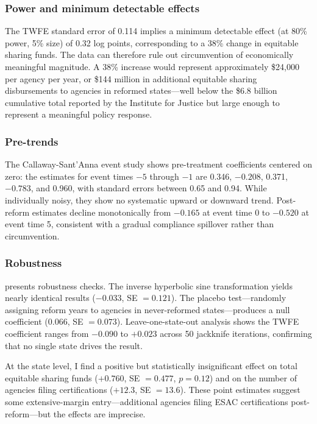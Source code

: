 \documentclass[12pt]{article}
\begin{document}


\subsubsection*{Power and minimum detectable effects} The TWFE standard error of 0.114 implies a minimum detectable effect (at 80\% power, 5\% size) of 0.32 log points, corresponding to a 38\% change in equitable sharing funds. The data can therefore rule out circumvention of economically meaningful magnitude. A 38\% increase would represent approximately \$24,000 per agency per year, or \$144 million in additional equitable sharing disbursements to agencies in reformed states---well below the \$6.8 billion cumulative total reported by the Institute for Justice but large enough to represent a meaningful policy response.

\subsubsection*{Pre-trends} The Callaway-Sant'Anna event study shows pre-treatment coefficients centered on zero: the estimates for event times $-5$ through $-1$ are 0.346, $-0.208$, 0.371, $-0.783$, and 0.960, with standard errors between 0.65 and 0.94. While individually noisy, they show no systematic upward or downward trend. Post-reform estimates decline monotonically from $-0.165$ at event time 0 to $-0.520$ at event time 5, consistent with a gradual compliance spillover rather than circumvention.

\subsubsection*{Robustness}  presents robustness checks. The inverse hyperbolic sine transformation yields nearly identical results ($-0.033$, SE $= 0.121$). The placebo test---randomly assigning reform years to agencies in never-reformed states---produces a null coefficient (0.066, SE $= 0.073$). Leave-one-state-out analysis shows the TWFE coefficient ranges from $-0.090$ to $+0.023$ across 50 jackknife iterations, confirming that no single state drives the result.

At the state level, I find a positive but statistically insignificant effect on total equitable sharing funds ($+0.760$, SE $= 0.477$, $p = 0.12$) and on the number of agencies filing certifications ($+12.3$, SE $= 13.6$). These point estimates suggest some extensive-margin entry---additional agencies filing ESAC certifications post-reform---but the effects are imprecise.
\end{document}
